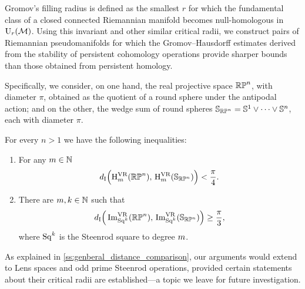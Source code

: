 Gromov's filling radius is defined as the smallest \(r\) for which the fundamental class of a closed connected Riemannian manifold becomes null-homologous in \(\mathrm{U}_r(\mathcal{M})\).
Using this invariant and other similar critical radii, we construct pairs of Riemannian pseudomanifolds for which the Gromov--Hausdorff estimates derived from the stability of persistent cohomology operations provide sharper bounds than those obtained from persistent homology.



Specifically, we consider, on one hand, the real projective space \(\mathbb{RP}^n\), with diameter \(\pi\), obtained as the quotient of a round sphere under the antipodal action; and on the other, the wedge sum of round spheres \(\mathbb{S}_{\mathbb{RP}^n} = \mathbb{S}^1 \vee \dots \vee \mathbb{S}^n\), each with diameter \(\pi\).

\medskip\theorem
For every \(n > 1\) we have the following inequalities:
\begin{enumerate}
	\item For any \(m \in \mathbb{N}\)
	\[
	d_{\mathrm{I}}\Big(\mathrm{H}^{\mathrm{VR}}_m(\mathbb{RP}^n),\, \mathrm{H}^{\mathrm{VR}}_m(\mathbb{S}_{\mathbb{RP}^n})\Big) < \frac{\pi}{4}.
	\]

	\item There are \(m, k \in \mathbb{N}\) such that
	\[
	d_{\mathrm{I}}\Big(\operatorname{Im}_{\mathrm{Sq}^k}^{\mathrm{VR}}(\mathbb{RP}^n),\, \operatorname{Im}_{\mathrm{Sq}^k}^{\mathrm{VR}}(\mathbb{S}_{\mathbb{RP}^n})\Big) \geq \frac{\pi}{3},
	\]
	where \(\mathrm{Sq}^k\) is the Steenrod square to degree \(m\).
\end{enumerate}

\medskip As explained in \cref{ss:genberal_distance_comparison}, our arguments would extend to Lens spaces and odd prime Steenrod operations, provided certain statements about their critical radii are established---a topic we leave for future investigation.